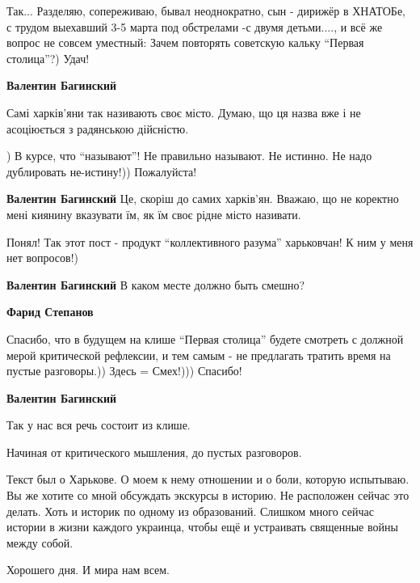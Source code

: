 \begin{itemize}
Так... Разделяю, сопереживаю, бывал неоднократно, сын - дирижёр в ХНАТОБе, с
трудом выехавший 3-5 марта под обстрелами -с двумя детьми...., и всё же вопрос
не совсем уместный: Зачем повторять советскую кальку \enquote{Первая столица}?)
Удач!

\begin{itemize} %
\textbf{Валентин Багинский}

Самі харків'яни так називають своє місто. Думаю, що ця назва вже і не
асоціюється з радянською дійсністю.


) В курсе, что \enquote{называют}! Не правильно называют. Не истинно. Не надо
дублировать не-истину!)) Пожалуйста!

\begin{itemize} %
\textbf{Валентин Багинский}
Це, скоріш до самих харків'ян.
Вважаю, що не коректно мені киянину вказувати їм, як їм своє рідне місто називати.


Понял! Так этот пост - продукт \enquote{коллективного разума} харьковчан! К ним
у меня нет вопросов!)

\textbf{Валентин Багинский}
В каком месте должно быть смешно?

\textbf{Фарид Степанов} 

Спасибо, что в будущем на клише \enquote{Первая столица} будете смотреть с должной
мерой критической рефлексии, и тем самым - не предлагать тратить время на
пустые разговоры.)) Здесь = Смех!))) Спасибо!

\textbf{Валентин Багинский}

Так у нас вся речь состоит из клише.

Начиная от критического мышления, до пустых разговоров.

Текст был о Харькове. О моем к нему отношении и о боли, которую испытываю. Вы
же хотите со мной обсуждать экскурсы в историю. Не расположен сейчас это
делать. Хоть и историк по одному из образований. Слишком много сейчас истории в
жизни каждого украинца, чтобы ещё и устраивать священные войны между собой.

Хорошего дня. И мира нам всем.

\end{itemize} %

\end{itemize} %


\end{itemize}

